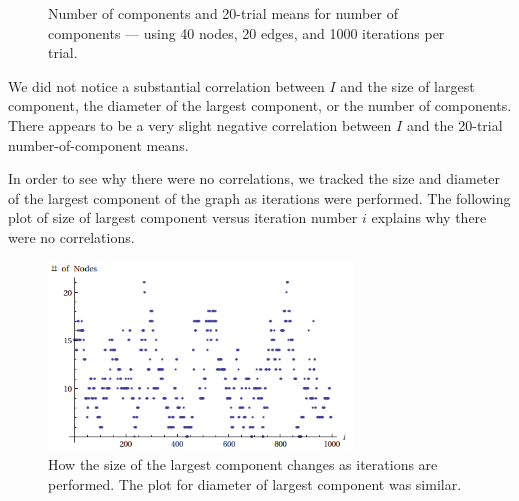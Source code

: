 \documentclass[a4paper,10pt]{article}
\begin{document}
\begin{figure}[H]
\begin{center}
\caption{Number of components and 20-trial means for number of components --- using 40 nodes, 20 edges, and 1000 iterations per trial.}
\end{center}
\end{figure} 

We did not notice a substantial correlation between $I$ and the size of largest component, the diameter of the largest component, or the number of components. There appears to be a very slight negative correlation between $I$ and the 20-trial number-of-component means.

In order to see why there were no correlations, we tracked the size and diameter of the largest component of the graph as iterations were performed. The following plot of size of largest component versus iteration number $i$ explains why there were no correlations. 

\begin{figure}[H]
\label{fig:gc-size-iter}
\begin{center}
\includegraphics[height=5cm]{images/gc_size_iter.png}
\caption{How the size of the largest component changes as iterations are performed. The plot for diameter of largest component was similar.}
\end{center}
\end{figure} 
\end{document}
